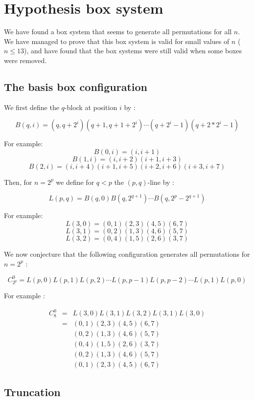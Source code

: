 \documentclass[11pt, a4paper]{article}
\begin{document}
\section{Hypothesis box system}

We have found a box system that seems to generate all permutations for all $n$.
We have managed to prove that this box system is valid for small values of $n$
($n \leq 13$), and have found that the box systems were still valid when some
boxes were removed.

\subsection{The basis box configuration}

We first define the $q$-block at position $i$ by :

$$B(q,i) = (q,q+2^i)(q+1,q+1+2^i)\cdots(q+2^i-1)(q+2*2^i-1)$$

For example: 
$$B(0,i) = (i,i+1)$$
$$B(1,i) = (i, i+2)(i+1, i+3)$$
$$B(2, i) = (i,i+4)(i+1,i+5)(i+2,i+6)(i+3,i+7)$$

Then, for $n=2^p$ we define for $q < p$ the $(p,q)$-line by :

$$L(p,q) = B(q,0) B(q,2^{q+1}) \cdots B(q,2^p-2^{q+1})$$

For example:
$$L(3,0) = (0,1)(2,3)(4,5)(6,7)$$
$$L(3,1) = (0,2)(1,3)(4,6)(5,7)$$
$$L(3,2) = (0,4)(1,5)(2,6)(3,7)$$

We now conjecture that the following configuration generates all permutations
for $n=2^p$ :

$$C_{2^p}^0 = L(p,0) L(p,1) L(p,2) \cdots L(p,p-1) L(p,p-2) \cdots L(p,1) L(p,0)$$

For example :

$$
\begin{aligned}
    C_8^0 & = & L(3,0) L(3,1) L(3,2) L(3,1) L(3,0) \\
        & = & (0,1)(2,3)(4,5)(6,7) \\
        & & (0,2)(1,3)(4,6)(5,7) \\
        & & (0,4)(1,5)(2,6)(3,7) \\
        & & (0,2)(1,3)(4,6)(5,7) \\
        & & (0,1)(2,3)(4,5)(6,7)
\end{aligned}$$

\subsection{Truncation}
\end{document}
